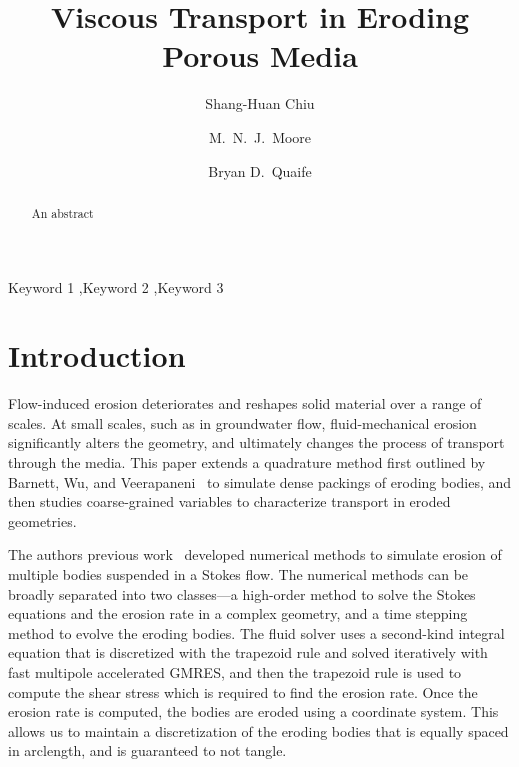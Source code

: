 \documentclass[preprint, 10pt]{elsarticle}
\begin{document}
\title{Viscous Transport in Eroding Porous Media}



\author[SH]{Shang-Huan Chiu}
\author[Nick]{M.~N.~J.~Moore}
\author[Bryan]{Bryan D.~Quaife}

\address[SH]{Department of Scientific Computing, Florida State
University, Tallahassee, FL, 32306.}
\address[Nick]{Department of Mathematics and Geophysical Fluid Dynamics Institute, Florida State University, Tallahassee, FL, 32306.}
\address[Bryan]{Department of Scientific Computing and Geophysical Fluid Dynamics Institute, Florida State University, Tallahassee, FL, 32306.}

\begin{abstract} 
  An abstract
\end{abstract}

\begin{keyword}
  Keyword 1 \sep Keyword 2 \sep Keyword 3 
\end{keyword}

\maketitle

\section{Introduction}
\label{sec:intro}
Flow-induced erosion deteriorates and reshapes solid material over a
range of scales.  At small scales, such as in groundwater flow,
fluid-mechanical erosion significantly alters the geometry, and
ultimately changes the process of transport through the media.  This
paper extends a quadrature method first outlined by Barnett, Wu, and
Veerapaneni~\cite{bar-wu-vee2015} to simulate dense packings of eroding
bodies, and then studies coarse-grained variables to characterize
transport in eroded geometries.

The authors previous work~\cite{qua-moo2018} developed numerical methods
to simulate erosion of multiple bodies suspended in a Stokes flow.  The
numerical methods can be broadly separated into two classes---a
high-order method to solve the Stokes equations and the erosion rate in
a complex geometry, and a time stepping method to evolve the eroding
bodies.  The fluid solver uses a second-kind integral equation that is
discretized with the trapezoid rule and solved iteratively with fast
multipole accelerated GMRES, and then the trapezoid rule is used to
compute the shear stress which is required to find the erosion rate.
Once the erosion rate is computed, the bodies are eroded using a {\thL}
coordinate system.  This allows us to maintain a discretization of the
eroding bodies that is equally spaced in arclength, and is guaranteed to
not tangle.
\end{document}
